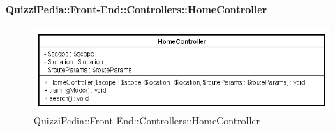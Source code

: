 \paragraph{QuizziPedia::Front-End::Controllers::HomeController}
\begin{figure} [ht]
	\centering
	\includegraphics[scale=0.6]{UML/Classi/Front-End/QuizziPedia_Front-end_Controller_HomeController.png}
	\caption{QuizziPedia::Front-End::Controllers::HomeController}
\end{figure} \FloatBarrier
